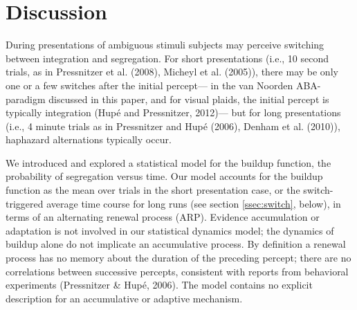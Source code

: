 \section{Discussion}

During presentations of ambiguous stimuli subjects may perceive switching between integration and segregation. For short presentations (i.e., 10 second trials, as in Pressnitzer et al. (2008), Micheyl et al. (2005)), there may be only one or a few switches after the initial percept--- in the van Noorden ABA- paradigm discussed in this paper, and for visual plaids, the initial percept is typically integration (Hupé and Pressnitzer, 2012)--- but for long presentations (i.e., 4 minute trials as in Pressnitzer and Hupé (2006), Denham et al. (2010)), haphazard alternations typically occur. 

We introduced and explored a statistical model for the buildup function, the probability of segregation versus time. Our model accounts for the buildup function as the mean over trials in the short presentation case, or the switch-triggered average time course for long runs (see section \ref{ssec:switch}, below), in terms of an alternating renewal process (ARP). Evidence accumulation or adaptation is not involved in our statistical dynamics model; the dynamics of buildup alone do not implicate an accumulative process. By definition a renewal process has no memory about the duration of the preceding percept; there are no correlations between successive percepts, consistent with reports from behavioral experiments (Pressnitzer \& Hupé, 2006). The model contains no explicit description for an accumulative or adaptive mechanism. 


